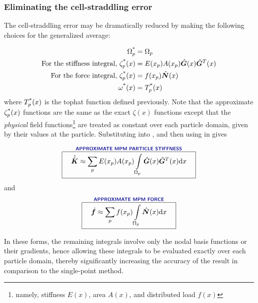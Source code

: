 \subsubsection{Eliminating the cell-straddling error}
The cell-straddling error may be dramatically reduced by making the following choices for the generalized average:

\begin{subequations}
\begin{align}
  \Omega_p^{\text{*}} &= \Omega_p
\\
 \text{For the stiffness integral, }  \zeta_p^{\text{*}}(x)&=E(x_p)A(x_p)\hat{\bm{G}}(x)\hat{\bm{G}}^T(x)
\\
 \text{For the force integral, }  \zeta_p^{\text{*}}(x)&=f(x_p)\hat{\bm{N}}(x)
\\
  \omega^{\text{*}}(x) &=T_p^{\text{*}}(x)
\end{align}
\label{eq:GIMPChoices}
\end{subequations}
where $T_p^{\text{*}}(x)$ is the tophat function defined previously.  Note that the approximate $\zeta_p^{\text{*}}(x)$ functions are the same as the exact $\zeta(x)$ functions except that the \textit{physical} field functions\footnote{namely, stiffness $E(x)$, area $A(x)$, and distributed load $f(x)$} are treated as constant over each particle domain, given by their values at the particle. Substituting  into , and then using  in  gives


\begin{equation}
\overset{\text{\Defn{APPROXIMATE MPM PARTICLE STIFFNESS}}}{\boxit{\quad
  \AArray{K}
\approx
  \sum\limits_p E(x_p)A(x_p)\int\limits_{\Omega_p} \gradNBFa(x)\gradNBFa^T(x) \dd x
\quad}}
\label{eq:LinearBarStiffnessIntegral}
\end{equation}
and
\begin{equation}
\overset{\text{\Defn{APPROXIMATE MPM FORCE}}}{\boxit{\quad
  \Array{f}
\approx
  \sum\limits_p f(x_p)\int\limits_{\Omega_p} \NBFa(x) \dd x
\quad}}
\label{eq:LinearBarForceIntegral}
\end{equation}




In these forms, the remaining integrals involve only the nodal basis functions or their gradients, hence allowing these integrals to be evaluated exactly over each particle domain, thereby significantly increasing the accuracy of the result in comparison to the single-point method.

